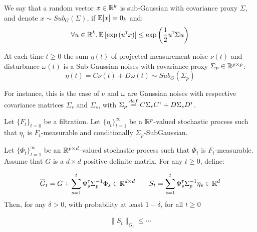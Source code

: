 \documentclass{article}
\begin{document}
We say that a random vector $x\in\mathbb{R}^k$ is sub-Gaussian with covariance proxy $\Sigma$, and denote $x\sim Sub_G(\Sigma)$, if $\operatorname*{\mathbb{E}}[x] = 0_k$ and:
\[
\forall u\in\mathbb{R}^k, \operatorname*{\mathbb{E}} \left[ \exp{\left( u^{\mathsf{\scriptscriptstyle T}}x\right)}\right] \leq \exp{\left( \frac{1}{2} u^{\mathsf{\scriptscriptstyle T}}\Sigma u\right)}
\]

\begin{assumption}
\label{assumpt:noise}
At each time $t\geq0$ the sum $\eta(t)$ of projected measurement noise $\nu(t)$ and disturbance $\omega(t)$ is a Sub-Gaussian noises with covariance proxy $\Sigma_p \in \mathbb{R}^{p\times p}$:
\begin{equation*}
    \eta(t) = C\nu(t) + D\omega(t) \sim Sub_G(\Sigma_p)
\end{equation*}

For instance, this is the case of $\nu$ and $\omega$ are Gaussian noises with respective covariance matrices $\Sigma_r$ and $\Sigma_s$, with $\Sigma_p \stackrel{def}{=} C\Sigma_r C^{\mathsf{\scriptscriptstyle T}} + D\Sigma_s D^{\mathsf{\scriptscriptstyle T}}$.
\end{assumption}

\begin{lemma}
\label{lem:concentration}
Let $\{F_t\}_{t=0}$ be a filtration.
Let $\{\eta_t\}_{t=1}^\infty$ be a $\mathbb{R}^p$-valued stochastic process such that $\eta_t$ is $F_t$-measurable and conditionally $\Sigma_p$-SubGaussian.

Let $\{\Phi_t\}_{t=1}^\infty$ be an $\mathbb{R}^{p\times d}$-valued stochastic process such that $\Phi_t$ is $F_t$-measurable. Assume that $G$ is a $d\times d$ positive definite matrix. For any $t\geq 0$, define:

\begin{equation*}
    \overline{G}_t = G + \sum_{s=1}^t \Phi_s^{\mathsf{\scriptscriptstyle T}} \Sigma_p^{-1} \Phi_s \in \mathbb{R}^{d\times d} \qquad S_t = \sum_{s=1}^t \Phi_s^{\mathsf{\scriptscriptstyle T}}\Sigma_p^{-1}\eta_s \in \mathbb{R}^{d}
\end{equation*}
Then, for any $\delta>0$, with probability at least $1-\delta$, for all $t\geq0$

\begin{align*}
    \|S_t\|_{\overline{G_t}} \leq \cdots
\end{align*}
\end{lemma}

\begin{theorem}
\label{thm:confidence_ellipsoid}
\end{theorem}
\end{document}
